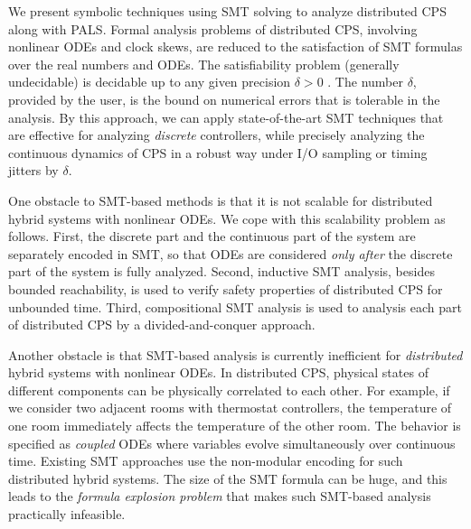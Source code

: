 We present symbolic techniques using SMT solving to analyze 
distributed CPS along with PALS.
Formal analysis problems of distributed CPS, 
involving nonlinear ODEs and clock skews, 
are reduced to the satisfaction of SMT formulas over the real numbers and ODEs.
%
The satisfiability problem
(generally undecidable)
 is decidable up to any given precision $\delta > 0$ \cite{delta-comp,sat-ode}.
The number $\delta$, provided by the user, 
is the bound on numerical errors that is tolerable in the analysis.
By this approach, 
we can apply state-of-the-art SMT techniques that are %
effective for analyzing \emph{discrete} controllers,
while precisely analyzing
the continuous dynamics of CPS
in a robust way under I/O sampling or timing jitters %
by $\delta$.


One obstacle to SMT-based methods is 
that it is not scalable for distributed hybrid systems with nonlinear ODEs.
We cope with this scalability problem as follows.
First, the discrete part and the continuous part of the system are separately encoded in SMT, 
so that ODEs are considered \emph{only after} the discrete part of the system is fully analyzed.
Second, inductive SMT analysis, besides bounded reachability, is used to verify safety properties of distributed CPS for unbounded time.
Third, compositional SMT analysis is used to analysis each part of distributed CPS by a divided-and-conquer approach. %




Another  obstacle %
is that  SMT-based analysis 
is currently inefficient
for \emph{distributed} hybrid systems with nonlinear ODEs. 
In distributed CPS, 
physical states of different components can be physically correlated to each other.
For example, if we consider two adjacent rooms with thermostat controllers, the temperature of one room immediately affects the temperature of the other room. %
The behavior is specified as \emph{coupled} ODEs
where variables evolve simultaneously over continuous time.
Existing SMT approaches use the non-modular encoding
for such distributed hybrid systems. 
%
The size of the SMT formula can be huge,
and  this leads to the \emph{formula explosion problem}
that makes such SMT-based analysis practically infeasible.

